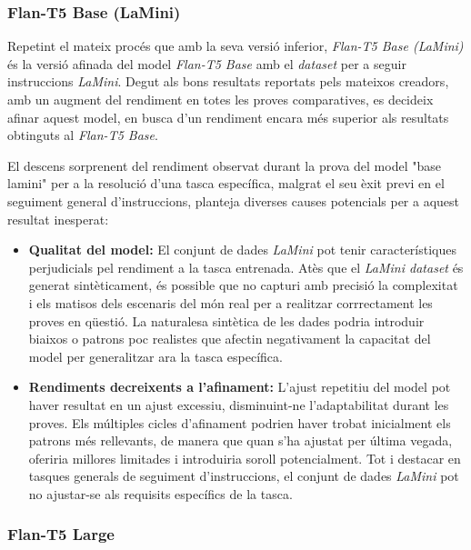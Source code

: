 \subsubsection{Flan-T5 Base (LaMini)}
Repetint el mateix procés que amb la seva versió inferior, \textit{Flan-T5 Base (LaMini)} \cite{flan-t5} \cite{lamini} és la versió afinada del model \textit{Flan-T5 Base} amb el \textit{dataset} per a seguir instruccions \textit{LaMini}. Degut als bons resultats reportats pels mateixos creadors, amb un augment del rendiment en totes les proves comparatives, es decideix afinar aquest model, en busca d'un rendiment encara més superior als resultats obtinguts al \textit{Flan-T5 Base}.

El descens sorprenent del rendiment observat durant la prova del model "base lamini" per a la resolució d'una tasca específica, malgrat el seu èxit previ en el seguiment general d'instruccions, planteja diverses causes potencials per a aquest resultat inesperat:

\begin{itemize}
  \item \textbf{Qualitat del model:} El conjunt de dades \textit{LaMini} pot tenir característiques perjudicials pel rendiment a la tasca entrenada. Atès que el \textit{LaMini dataset} és generat sintèticament, és possible que no capturi amb precisió la complexitat i els matisos dels escenaris del món real per a realitzar corrrectament les proves en qüestió. La naturalesa sintètica de les dades podria introduir biaixos o patrons poc realistes que afectin negativament la capacitat del model per generalitzar ara la tasca específica.
  \item \textbf{Rendiments decreixents a l'afinament:} L'ajust repetitiu del model pot haver resultat en un ajust excessiu, disminuint-ne l'adaptabilitat durant les proves. Els múltiples cicles d'afinament podrien haver trobat inicialment els patrons més rellevants, de manera que quan s'ha ajustat per última vegada, oferiria millores limitades i introduiria soroll potencialment. Tot i destacar en tasques generals de seguiment d'instruccions, el conjunt de dades \textit{LaMini} pot no ajustar-se als requisits específics de la tasca.
\end{itemize}

\subsubsection{Flan-T5 Large}


